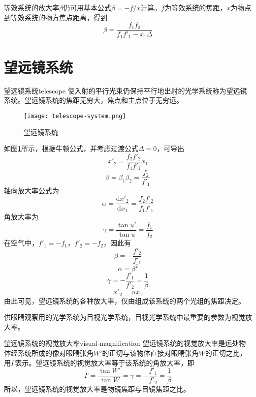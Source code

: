 \documentclass[cn,11pt]{elegantbook}
\begin{document}
等效系统的放大率$\beta$仍可用基本公式$\beta=-f/x$计算。$f$为等效系统的焦距，$x$为物点到等效系统的物方焦点距离，得到
\begin{equation}
\beta=\frac{f_1f_2}{f_1f'_1-x_1\Delta}
\end{equation}

\section{望远镜系统}

\begin{definition}{望远镜系统}{telescope}
	使入射的平行光束仍保持平行地出射的光学系统称为望远镜系统。望远镜系统的焦距无穷大，焦点和主点位于无穷远。
\end{definition}

\begin{figure}[htbp]
	\centering
	\texttt{[image: telescope-system.png]}
	\caption{望远镜系统}
	\label{fig:telescope-system}
\end{figure}

如图\ref{fig:telescope-system}所示，根据牛顿公式，并考虑过渡公式$\Delta=0$，可导出
\begin{equation}
x'_2=\frac{f_2f'_2}{f_1f'_1}x_1
\end{equation}
\begin{equation}
\beta=\beta_1\beta_2=\frac{f_2}{f'_1}
\end{equation}
轴向放大率公式为
\begin{equation}
\alpha=\frac{\mathrm{d}x'_2}{\mathrm{d}x_1}=\frac{f_2f'_2}{f_1f'_1}
\end{equation}
角放大率为
\begin{equation}
\gamma=\frac{\tan u'}{\tan u}=\frac{f_1}{f_2}
\end{equation}
在空气中，$f'_1=-f_1$，$f'_2=-f_2$，因此有
\begin{equation}
\beta=-\frac{f'_2}{f'_1}
\end{equation}
\begin{equation}
\alpha=\beta^2
\end{equation}
\begin{equation}
\gamma=-\frac{f'_1}{f'_2}=\frac{1}{\beta}
\end{equation}
\begin{equation}
x'_2=\alpha x_1
\end{equation}
由此可见，望远镜系统的各种放大率，仅由组成该系统的两个光组的焦距决定。

供眼睛观察用的光学系统为目视光学系统，目视光学系统中最重要的参数为视觉放大率。
\begin{definition}{望远镜系统的视觉放大率}{visual-magnification}
	望远镜系统的视觉放大率是远处物体经系统所成的像对眼睛张角$W'$的正切与该物体直接对眼睛张角$W$的正切之比，用$\Gamma$表示。望远镜系统的视觉放大率等于该系统的角放大率，即
	\begin{equation}
	\Gamma=\frac{\tan W'}{\tan W}=\gamma=-\frac{f'_1}{f'_2}=\frac{1}{\beta}
	\end{equation}
	所以，望远镜系统的视觉放大率是物镜焦距与目镜焦距之比。
\end{definition}
\end{document}
